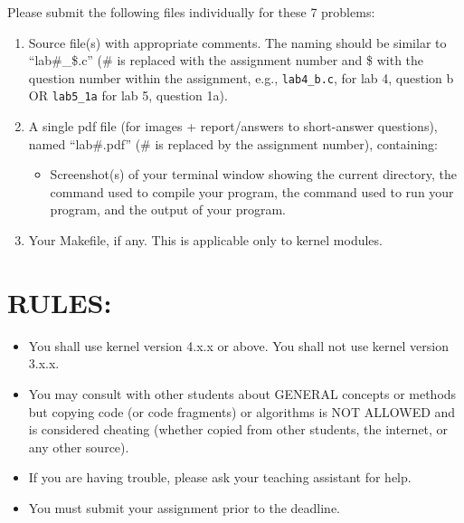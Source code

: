 \documentclass{article}
\begin{document}
Please submit the following files individually for these 7 problems:

\begin{enumerate}
    \item Source file(s) with appropriate comments. The naming should be similar to “lab\#\_\$.c” (\# is replaced with the assignment number and \$ with the question number within the assignment, e.g., \texttt{lab4\_b.c}, for lab 4, question b OR \texttt{lab5\_1a} for lab 5, question 1a).
    \item A single pdf file (for images + report/answers to short-answer questions), named “lab\#.pdf” (\# is replaced by the assignment number), containing:
    \begin{itemize}
        \item Screenshot(s) of your terminal window showing the current directory, the command used to compile your program, the command used to run your program, and the output of your program.
    \end{itemize}
    \item Your Makefile, if any. This is applicable only to kernel modules.
\end{enumerate}


\section*{RULES:}

\begin{itemize}
    \item You shall use kernel version 4.x.x or above. You shall not use kernel version 3.x.x.
    \item You may consult with other students about GENERAL concepts or methods but copying code (or code fragments) or algorithms is NOT ALLOWED and is considered cheating (whether copied from other students, the internet, or any other source).
    \item If you are having trouble, please ask your teaching assistant for help.
    \item You must submit your assignment prior to the deadline.
\end{itemize}
\end{document}
